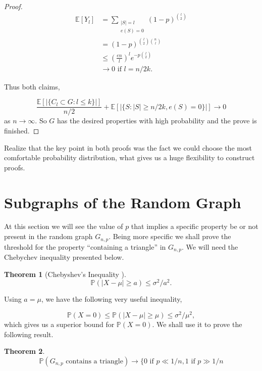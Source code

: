 \documentclass[12pt,twoside,a4paper]{book}
\numberwithin{equation}{section}
\newtheorem{theorem}             {Theorem}[section]
\theoremstyle{remark}
\begin{document}
\begin{proof}
\begin{align*}
\mathbb{E}[Y_l] &= \sum_{\substack{|S| = l \\ e(S) = 0 }} (1-p)^{\binom{l}{2}}\\
	       &= (1-p)^{\binom{l}{2} \binom{n}{l}} \\
	       &\leq \left(\frac{en}{l}\right)^l e^{-p\binom{l}{2}}\\
	       &\rightarrow 0  \text{ if } l = n/2k.
\end{align*}

Thus both claims,

$$\frac{\mathbb{E}[|\{C_l \subset G : l\leq k \}|]}{n/2} + \mathbb{E} [|\{ S:|S| \geq n/2k, e(S) = 0\}|] \rightarrow 0$$
as $n \rightarrow \infty $. So $G$ has the desired properties with high probability and the prove is finished.
\end{proof}

Realize that the key point in both proofs was the fact we could choose the most comfortable probability distribution, what gives us a huge flexibility to construct proofs.

\section{Subgraphs of the Random Graph}

At this section we will see the value of $p$ that implies a specific property be or not present in the random graph $G_{n,p}$. Being more specific we shall prove the threshold for the property ``containing a triangle'' in $G_{n,p}$.  We will need the Chebychev inequality presented below.

\begin{theorem}[{Chebyshev's Inequality \cite{Ch67}}]
$$\mathbb{P}(|X-\mu| \geq a) \leq \sigma^2/a^2.$$
\end{theorem} 

Using $a = \mu$, we have the following very useful inequality,

$$\mathbb{P}(X=0) \leq \mathbb{P}(|X-\mu | \geq \mu) \leq \sigma^2/\mu^2,$$
which gives us a superior bound for $\mathbb{P}(X=0)$. We shall use it to prove the following result.\\

\begin{theorem}
$$ \mathbb{P}(G_{n,p}\text{ contains a triangle}) \rightarrow \big\{ 0 \text{ if } p \ll 1/n, 1 \text{ if } p \gg 1/n $$
\end{theorem}
\end{document}
